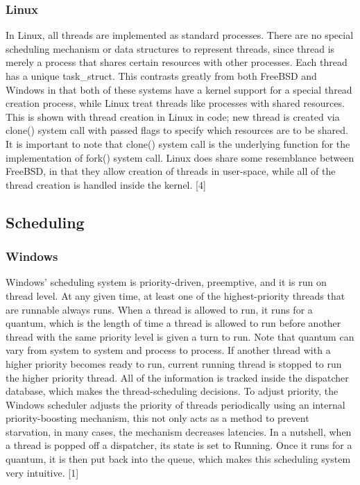 \documentclass[10pt,a4paper]{article}
\begin{document}
\subsubsection{Linux}
In Linux, all threads are implemented as standard processes. There are no special scheduling mechanism or data structures to represent threads, since thread is merely a process that shares certain resources with other processes. Each thread has a unique task\_struct. This contrasts greatly from both FreeBSD and Windows in that both of these systems have a kernel support for a special thread creation process, while Linux treat threads like processes with shared resources. This is shown with thread creation in Linux in code; new thread is created via clone() system call with passed flags to specify which resources are to be shared. It is important to note that clone() system call is the underlying function for the implementation of fork() system call. Linux does share some resemblance between FreeBSD, in that they allow creation of threads in user-space, while all of the thread creation is handled inside the kernel. [4]


\subsection{Scheduling}
\subsubsection{Windows}
Windows’ scheduling system is priority-driven, preemptive, and it is run on thread level. At any given time, at least one of the highest-priority threads that are runnable always runs. When a thread is allowed to run, it runs for a quantum, which is the length of time a thread is allowed to run before another thread with the same priority level is given a turn to run. Note that quantum can vary from system to system and process to process. If another thread with a higher priority becomes ready to run, current running thread is stopped to run the higher priority thread. All of the information is tracked inside the dispatcher database, which makes the thread-scheduling decisions. To adjust priority, the Windows scheduler adjusts the priority of threads periodically using an internal priority-boosting mechanism, this not only acts as a method to prevent starvation, in many cases, the mechanism decreases latencies. In a nutshell, when a thread is popped off a dispatcher, its state is set to Running. Once it runs for a quantum, it is then put back into the queue, which makes this scheduling system very intuitive. [1]
\end{document}
